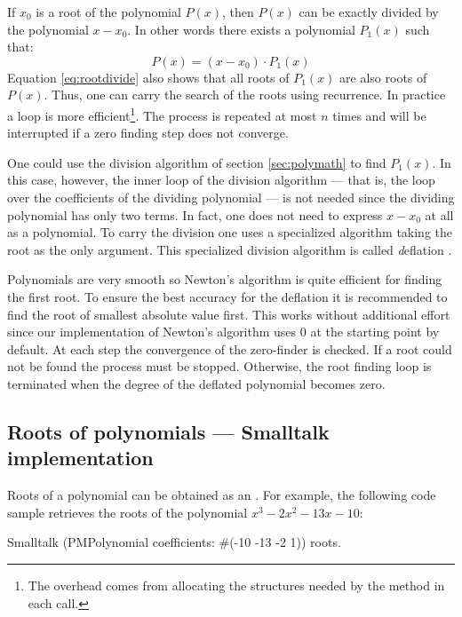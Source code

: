 If $x_0$ is a root of the polynomial $P\left(x\right)$, then
$P\left(x\right)$ can be exactly divided by the polynomial
$x-x_0$. In other words there exists a polynomial
$P_1\left(x\right)$ such that:
\begin{equation}
\label{eq:rootdivide}
  P\left(x\right) = \left(x-x_0\right)\cdot P_1\left(x\right)
\end{equation}
Equation \ref{eq:rootdivide} also shows that all roots of
$P_1\left(x\right)$ are also roots of $P\left(x\right)$. Thus, one
can carry the search of the roots using recurrence. In practice a
loop is more efficient\footnote{The overhead comes from allocating
the structures needed by the method in each call.}. The process is
repeated at most $n$ times and will be interrupted if a zero
finding step does not converge.

One could use the division algorithm of section \ref{sec:polymath}
to find $P_1\left(x\right)$. In this case, however, the inner loop
of the division algorithm --- that is, the loop over the
coefficients of the dividing polynomial --- is not needed since
the dividing polynomial has only two terms. In fact, one does not
need to express $x-x_0$ at all as a polynomial. To carry the
division one uses a specialized algorithm taking the root as the
only argument. This specialized division algorithm is called {\textsl
deflation} \cite{Press}.

Polynomials are very smooth so Newton's algorithm is quite
efficient for finding the first root. To ensure the best accuracy
for the deflation it is recommended to find the root of smallest
absolute value first. This works without additional effort since
our implementation of Newton's algorithm uses 0 at the starting
point by default. At each step the convergence of the zero-finder
is checked. If a root could not be found the process must be
stopped. Otherwise, the root finding loop is terminated when the
degree of the deflated polynomial becomes zero.

\subsection{Roots of polynomials --- Smalltalk implementation}
Roots of a polynomial can be obtained as an . For example, the following code sample retrieves the roots of the polynomial $x^3-2x^2-13x-10$:
\begin{displaycode}{Smalltalk}
(PMPolynomial coefficients: #(-10 -13 -2 1)) roots.
\end{displaycode}

